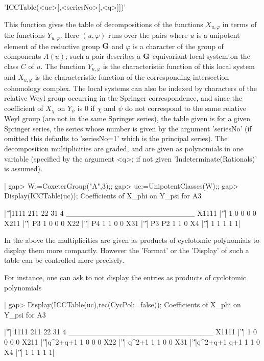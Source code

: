 'ICCTable(<uc>[,<seriesNo>[,<q>]])'

This  function  gives  the  table  of  decompositions  of  the  functions $
X_{u,\varphi}$   in   terms   of   the   functions   $Y_{u,\varphi}$.  Here
$(u,\varphi)$  runs over the pairs where $u$  is a unipotent element of the
reductive  group  ${\bf G}$  and  $\varphi$  is  a  character  of  the group of
components  $A(u)$; such a pair  describes a ${\bf G}$-equivariant local system
on the class $C$ of $u$. The function $Y_{u,\varphi}$ is the characteristic
function  of this  local system  and $X_{u,\varphi}$  is the characteristic
function  of the  corresponding intersection  cohomology complex. The local
systems  can  also  be  indexed  by  characters  of the relative Weyl group
occurring  in  the  Springer  correspondence,  and since the coefficient of
$X_\chi$  on $Y_\psi$ is $0$ if $\chi$  and $\psi$ do not correspond to the
same  relative Weyl group (are not in  the same Springer series), the table
given  is for a given Springer series,  the series whose number is given by
the  argument 'seriesNo' (if omitted this defaults to 'seriesNo=1' which is
the principal series). The decomposition multiplicities are graded, and are
given as polynomials in one variable (specified by the argument <q>; if not
given 'Indeterminate(Rationals)' is assumed).

|    gap> W:=CoxeterGroup("A",3);;
    gap> uc:=UnipotentClasses(W);;
    gap> Display(ICCTable(uc));
    Coefficients of X_phi on Y_psi for A3
    
          |'\|'|1111 211 22 31 4
    ________________________
    X1111 |'\|'|   1   0  0  0 0
    X211  |'\|'|  P3   1  0  0 0
    X22   |'\|'|  P4   1  1  0 0
    X31   |'\|'|  P3  P2  1  1 0
    X4    |'\|'|   1   1  1  1 1|

In  the  above  the  multiplicities  are  given  as  products of cyclotomic
polynomials  to display  them more  compactly. However  the 'Format' or the
'Display'   of  such  a  table  can   be  controlled  more  precisely.

For  instance,  one  can  ask  to  not  display  the entries as products of
cyclotomic polynomials\:

|    gap> Display(ICCTable(uc),rec(CycPol:=false));
    Coefficients of X_phi on Y_psi for A3
    
          |'\|'|   1111 211 22 31 4
    ___________________________
    X1111 |'\|'|      1   0  0  0 0
    X211  |'\|'|q^2+q+1   1  0  0 0
    X22   |'\|'|  q^2+1   1  1  0 0
    X31   |'\|'|q^2+q+1 q+1  1  1 0
    X4    |'\|'|      1   1  1  1 1|

